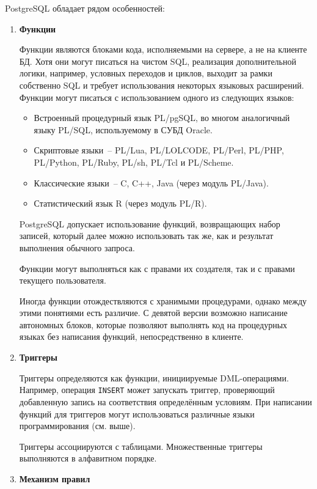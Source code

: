 PostgreSQL обладает рядом особенностей:
\begin{enumerate}
    \item \textbf{Функции}
    
    \tab Функции являются блоками кода, исполняемыми на сервере, а не на клиенте БД. Хотя они могут писаться на чистом SQL, реализация дополнительной логики, например, условных переходов и циклов, выходит за рамки собственно SQL и требует использования некоторых языковых расширений. Функции могут писаться с использованием одного из следующих языков:
    \begin{itemize}
        \item Встроенный процедурный язык PL/pgSQL, во многом аналогичный языку PL/SQL, используемому в СУБД Oracle.
        \item Скриптовые языки -- PL/Lua, PL/LOLCODE, PL/Perl, PL/PHP, PL/Python, PL/Ruby, PL/sh, PL/Tcl и PL/Scheme.
        \item Классические языки -- C, C++, Java (через модуль PL/Java).
        \item Статистический язык R (через модуль PL/R).
    \end{itemize}

    \tab PostgreSQL допускает использование функций, возвращающих набор записей, который далее можно использовать так же, как и результат выполнения обычного запроса.
    
    \tab Функции могут выполняться как с правами их создателя, так и с правами текущего пользователя.
    
    \tab Иногда функции отождествляются с хранимыми процедурами, однако между этими понятиями есть различие. С девятой версии возможно написание автономных блоков, которые позволяют выполнять код на процедурных языках без написания функций, непосредственно в клиенте.


    \item \textbf{Триггеры}
    
    \tab Триггеры определяются как функции, инициируемые DML-операциями. Например, операция \texttt{INSERT} может запускать триггер, проверяющий добавленную запись на соответствия определённым условиям. При написании функций для триггеров могут использоваться различные языки программирования (см. выше). %
    
    \tab Триггеры ассоциируются с таблицами. Множественные триггеры выполняются в алфавитном порядке.


    \item \textbf{Механизм правил}


\end{enumerate}
